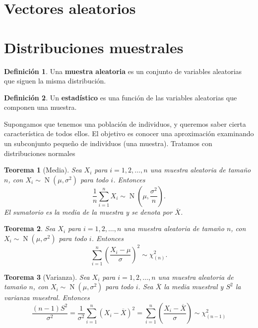 \documentclass{article}
\newtheorem{theorem}{Teorema}
\theoremstyle{definition}
\newtheorem{define}{Definición}
\theoremstyle{remark}
\DeclareMathOperator{\normal}{N}
\begin{document}
\section{Vectores aleatorios}

\section{Distribuciones muestrales}
\begin{define}
	Una \textbf{muestra aleatoria} es un conjunto de variables aleatorias que siguen la misma distribución.
\end{define}

\begin{define}
	Un \textbf{estadístico} es una función de las variables aleatorias que componen una muestra.
\end{define}

Supongamos que tenemos una población de individuos, y queremos saber cierta característica de todos ellos. El objetivo es conocer una aproximación examinando un subconjunto pequeño de individuos (una muestra). Tratamos con distribuciones normales

\begin{theorem}[Media]
	Sea $X_i$ para $i=1,2,\ldots,n$ una muestra aleatoria de tamaño $n$, con $X_i \sim \normal(\mu, \sigma^2)$ para todo $i$. Entonces
	\begin{equation*}
		\frac{1}{n} \sum_{i=1}^{n} X_i \sim \normal(\mu, \frac{\sigma^2}{n}).
	\end{equation*}
	El sumatorio es la media de la muestra y se denota por $\overline{X}$.
\end{theorem}

\begin{theorem}
	Sea $X_i$ para $i=1,2,\ldots,n$ una muestra aleatoria de tamaño $n$, con $X_i \sim \normal(\mu, \sigma^2)$ para todo $i$. Entonces
	\begin{equation*}
		\sum_{i=1}^{n} \left(\frac{X_i - \mu}{\sigma}\right)^2 \sim \chi_{(n)}^2.
	\end{equation*}
\end{theorem}

\begin{theorem}[Varianza]
	Sea $X_i$ para $i=1,2,\ldots,n$ una muestra aleatoria de tamaño $n$, con $X_i \sim \normal(\mu, \sigma^2)$ para todo $i$. Sea $\overline{X}$ la media muestral y $S^2$ la varianza muestral. Entonces
	\begin{equation*}
		\frac{(n-1)S^2}{\sigma^2} = \frac{1}{\sigma^2} \sum_{i=1}^{n} (X_i - \overline{X})^2 = \sum_{i=1}^{n} \left( \frac{X_i - \overline{X}}{\sigma}\right) \sim \chi_{(n-1)}^2
	\end{equation*}
\end{theorem}
\end{document}
